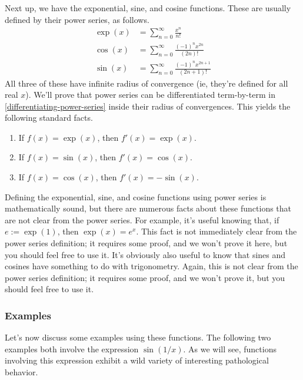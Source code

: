 Next up, we have the exponential, sine, and cosine functions. These are usually defined by their power series, as follows. 
\begin{equation} \label{exp-sin-cos-power-series} \begin{aligned} \exp(x) &= \sum_{n = 0}^\infty \frac{x^n}{n!} \\
\cos(x) &= \sum_{n = 0}^\infty \frac{(-1)^n x^{2n}}{(2n)!} \\
\sin(x) &= \sum_{n = 0}^\infty \frac{(-1)^n x^{2n+1}}{(2n+1)!} \end{aligned} \end{equation}
All three of these have infinite radius of convergence (ie, they're defined for all real $x$). We'll prove that power series can be differentiated term-by-term in \cref{differentiating-power-series} inside their radius of convergences. This yields the following standard facts. 
\begin{enumerate}[(1)]
	\item If $f(x) = \exp(x)$, then $f'(x) = \exp(x)$. 
	\item If $f(x) = \sin(x)$, then $f'(x) = \cos(x)$. 
	\item If $f(x) = \cos(x)$, then $f'(x) = -\sin(x)$.
\end{enumerate} 

\begin{pedanticremark}
	Defining the exponential, sine, and cosine functions using power series is mathematically sound, but there are numerous facts about these functions that are not clear from the power series. For example, it's useful knowing that, if $e := \exp(1)$, then $\exp(x) = e^x$. This fact is not immediately clear from the power series definition; it requires some proof, and we won't prove it here, but you should feel free to use it. It's obviously also useful to know that sines and cosines have something to do with trigonometry. Again, this is not clear from the power series definition; it requires some proof, and we won't prove it, but you should feel free to use it. 
\end{pedanticremark}


\subsubsection*{Examples}

Let's now discuss some examples using these functions. The following two examples both involve the expression $\sin(1/x)$. As we will see, functions involving this expression exhibit a wild variety of interesting pathological behavior. 

